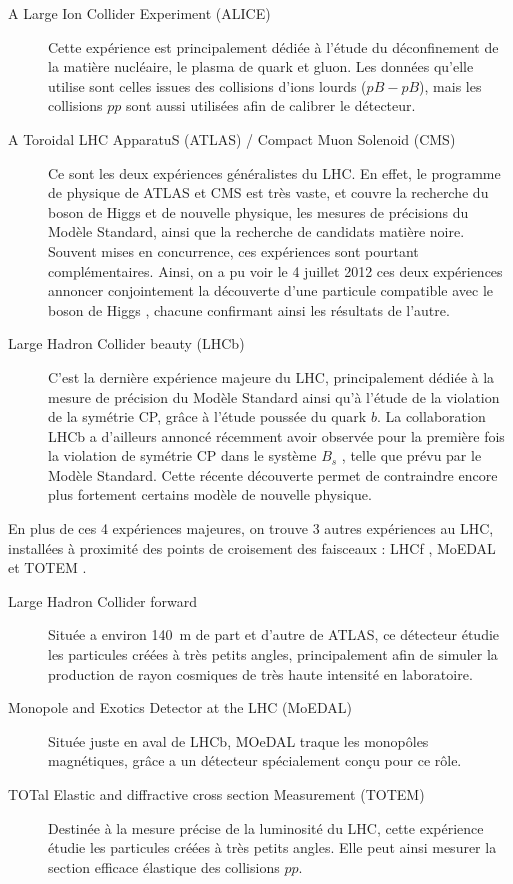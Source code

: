 \begin{description}
  \item[A Large Ion Collider Experiment (ALICE)] Cette expérience est principalement dédiée à l'étude du déconfinement de la matière nucléaire, le plasma de quark et gluon. Les données qu'elle utilise sont celles issues des collisions d'ions lourds ($pB-pB$), mais les collisions $pp$ sont aussi utilisées afin de calibrer le détecteur.
  \item[A Toroidal LHC ApparatuS (ATLAS) / Compact Muon Solenoid (CMS)] Ce sont les deux expériences généralistes du LHC. En effet, le programme de physique de ATLAS et CMS est très vaste, et couvre la recherche du boson de Higgs et de nouvelle physique, les mesures de précisions du Modèle Standard, ainsi que la recherche de candidats matière noire. Souvent mises en concurrence, ces expériences sont pourtant complémentaires. Ainsi, on a pu voir le 4 juillet 2012 ces deux expériences annoncer conjointement la découverte d'une particule compatible avec le boson de Higgs \citep{higgs_atlas,higgs_cms}, chacune confirmant ainsi les résultats de l'autre.
  \item[Large Hadron Collider beauty (LHCb)] C'est la dernière expérience majeure du LHC, principalement dédiée à la mesure de précision du Modèle Standard ainsi qu'à l'étude de la violation de la symétrie CP, grâce à l'étude poussée du quark $b$. La collaboration LHCb a d'ailleurs annoncé récemment avoir observée pour la première fois la violation de symétrie CP dans le système $B_s$ \citep{lhcb_bs}, telle que prévu par le Modèle Standard. Cette récente découverte permet de contraindre encore plus fortement certains modèle de nouvelle physique.
\end{description}

En plus de ces 4 expériences majeures, on trouve 3 autres expériences au LHC, installées à proximité des points de croisement des faisceaux : LHCf \citep{lhcf}, MoEDAL \citep{moedal} et TOTEM \citep{totem}.

\begin{description}
  \item[Large Hadron Collider forward] Située a environ \SI{140}{\m} de part et d'autre de ATLAS, ce détecteur étudie les particules créées à très petits angles, principalement afin de simuler la production de rayon cosmiques de très haute intensité en laboratoire.
  \item[Monopole and Exotics Detector at the LHC (MoEDAL)] Située juste en aval de LHCb, MOeDAL traque les monopôles magnétiques, grâce a un détecteur spécialement conçu pour ce rôle.
  \item[TOTal Elastic and diffractive cross section Measurement (TOTEM)] Destinée à la mesure précise de la luminosité du LHC, cette expérience étudie les particules créées à très petits angles. Elle peut ainsi mesurer la section efficace élastique des collisions $pp$.
\end{description}

